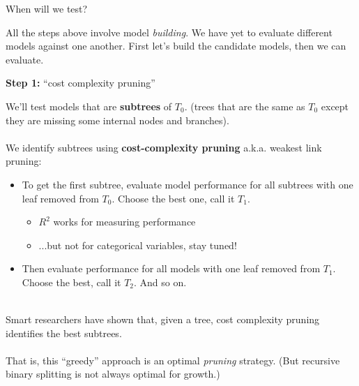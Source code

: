 \documentclass[mathserif, aspectratio=169]{beamer}
\begin{document}
\begin{frame}{When will we test?}

All the steps above involve model \textit{building}.  We have yet to evaluate different models against one another.  First let's build the candidate models, then we can evaluate.
\end{frame}

\begin{frame}{\textbf{Step 1: } ``cost complexity pruning''}

We'll test models that are \textbf{subtrees} of $T_0$. (trees that are the same as $T_0$ except they are missing some internal nodes and branches).\\~\\

We identify subtrees using \textbf{cost-complexity pruning} a.k.a. weakest link pruning:

\begin{itemize}
\item To get the first subtree, evaluate model performance for all subtrees with one leaf removed from $T_0$.  Choose the best one, call it $T_1$.  
\begin{itemize}
\item $R^2$ works for measuring performance
\item ...but not for categorical variables, stay tuned!
\end{itemize}
\item Then evaluate performance for all models with one leaf removed from $T_1$.  Choose the best, call it $T_2$.  And so on.  \\~\\
\end{itemize}

\pause

Smart researchers have shown that, given a tree, cost complexity pruning identifies the best subtrees.\\~\\

That is, this ``greedy'' approach is an optimal \textit{pruning} strategy.  (But recursive binary splitting is not always optimal for growth.)

\end{frame}
\end{document}

